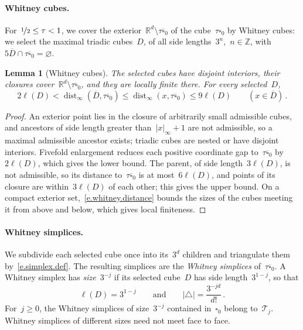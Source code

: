 \documentclass[11pt,letterpaper]{article}
\numberwithin{equation}{section}
\newtheorem{lemma}[theorem]{Lemma}
\theoremstyle{definition}
\newcommand{\Z}{\mathbb{Z}}
\newcommand{\Rd}{\mathbb{R}^d}
\newcommand{\nf}{\nicefrac}
\newcommand{\cu}{\square}
\DeclareMathOperator{\dist}{dist}
\begin{document}
\smallskip

\paragraph{Whitney cubes.} For~$\nf12\leq\tau<1$, we cover the exterior~$\Rd\setminus\tau\overline{\cu}_0$ of the cube~$\tau\cu_0$ by Whitney cubes: we select the maximal triadic cubes~$D$, of all side lengths~$3^n$,~$n\in\Z$, with~$5\overline D\cap\tau\overline{\cu}_0=\varnothing$.

\begin{lemma}[Whitney cubes]
\label{l.whitney.cubes}
The selected cubes have disjoint interiors, their closures cover~$\Rd\setminus\tau\overline{\cu}_0$, and they are locally finite there. For every selected~$D$,
\begin{equation}
	2\ell(D)<\dist_\infty(\overline D,\tau\overline{\cu}_0)\leq\dist_\infty(x,\tau\overline{\cu}_0)\leq9\ell(D)\qquad(x\in\overline D)\,.
	\label{e.whitney.distance}
\end{equation}
\end{lemma}

\begin{proof}
An exterior point lies in the closure of arbitrarily small admissible cubes, and ancestors of side length greater than~$|x|_\infty+1$ are not admissible, so a maximal admissible ancestor exists; triadic cubes are nested or have disjoint interiors. Fivefold enlargement reduces each positive coordinate gap to~$\tau\overline{\cu}_0$ by~$2\ell(D)$, which gives the lower bound. The parent, of side length~$3\ell(D)$, is not admissible, so its distance to~$\tau\overline{\cu}_0$ is at most~$6\ell(D)$, and points of its closure are within~$3\ell(D)$ of each other; this gives the upper bound. On a compact exterior set,~\eqref{e.whitney.distance} bounds the sizes of the cubes meeting it from above and below, which gives local finiteness.
\end{proof}

\smallskip

\paragraph{Whitney simplices.}
We subdivide each selected cube once into its~$3^d$ children and triangulate them by~\eqref{e.simplex.def}. The resulting simplices are the \emph{Whitney simplices} of~$\tau\overline{\cu}_0$. A Whitney simplex has \emph{size}~$3^{-j}$ if its selected cube~$D$ has side length~$3^{1-j}$, so that
\begin{equation}
	\ell(D)=3^{1-j}\qquad\mbox{and}\qquad |\triangle|=\frac{3^{-jd}}{d!}\,.
	\label{e.whitney.simplex.size}
\end{equation}
For~$j\geq0$, the Whitney simplices of size~$3^{-j}$ contained in~$\cu_0$ belong to~$\mathscr T_j$. Whitney simplices of different sizes need not meet face to face.
\end{document}

